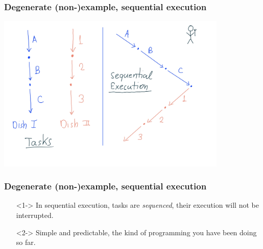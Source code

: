 \documentclass[xcolor={dvipsnames,svgnames},aspectratio=169]{beamer}
\begin{document}
\begin{frame}[fragile]
  \frametitle{Degenerate (non-)example, sequential execution}

  \begin{center}
    \includegraphics[width=11cm,keepaspectratio]{../media/lecture1-seq.png}
  \end{center}


\end{frame}

\begin{frame}[fragile]
  \frametitle{Degenerate (non-)example, sequential execution}

  \large{
    \begin{itemize}
    \item[\faBook]<1-> In sequential execution, tasks are \emph{sequenced},
      their execution will not be interrupted.
    \item[\faBook]<2-> Simple and predictable, the kind of programming you have
      been doing so far.
    \end{itemize}}

\end{frame}
\end{document}
